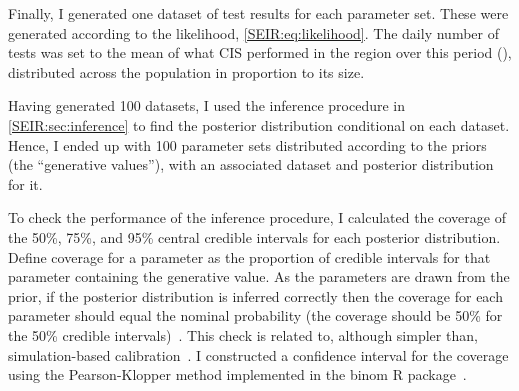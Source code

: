 \documentclass[thesis.tex]{subfiles}
\begin{document}
Finally, I generated one dataset of test results for each parameter set.
These were generated according to the likelihood, \cref{SEIR:eq:likelihood}.
The daily number of tests was set to the mean of what CIS performed in the region over this period (), distributed across the population in proportion to its size.

Having generated 100 datasets, I used the inference procedure in \cref{SEIR:sec:inference} to find the posterior distribution conditional on each dataset.
Hence, I ended up with 100 parameter sets distributed according to the priors (the ``generative values''), with an associated dataset and posterior distribution for it.

To check the performance of the inference procedure, I calculated the coverage of the 50\%, 75\%, and 95\% central credible intervals for each posterior distribution.
Define coverage for a parameter as the proportion of credible intervals for that parameter containing the generative value.
As the parameters are drawn from the prior, if the posterior distribution is inferred correctly then the coverage for each parameter should equal the nominal probability (\eg the coverage should be 50\% for the 50\% credible intervals)~\autocite{cookValidation}.
This check is related to, although simpler than, simulation-based calibration~\autocite{taltsValidating}.
I constructed a confidence interval for the coverage using the Pearson-Klopper method implemented in the binom R package~\autocite{binom1-1}.
\end{document}
